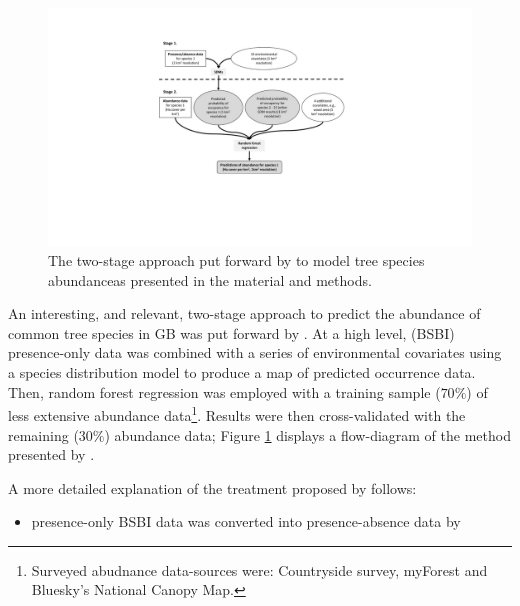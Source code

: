 \begin{figure}
    \centering
    \includegraphics[scale=0.50]{chapter2/figures/hill-method-fig.pdf}
    \caption{The two-stage approach put forward by \cite{hill.data} to model tree species abundance\textemdash as presented in the material and methods.}
    \label{fig:hill-method}
\end{figure}

An interesting, and relevant, two-stage approach to predict the abundance of common tree species in GB was put forward by \cite{hill.data}.
At a high level, (BSBI) presence-only data was combined with a series of environmental covariates using a species distribution model to 
produce a map of predicted occurrence data. Then, random forest regression was employed with a training sample ($70\%$) of less extensive abundance 
data\footnote{Surveyed abudnance data-sources were: Countryside survey, myForest and Bluesky's National Canopy Map.}. 
Results were then cross-validated with the remaining ($30\%$) abundance data; Figure \ref{fig:hill-method} displays a
flow-diagram of the method presented by \cite{hill.data}. 

A more detailed explanation of the treatment proposed by \cite{hill.data} follows:
\begin{itemize}
    \item presence-only BSBI data was converted into presence-absence data by 
\end{itemize}





